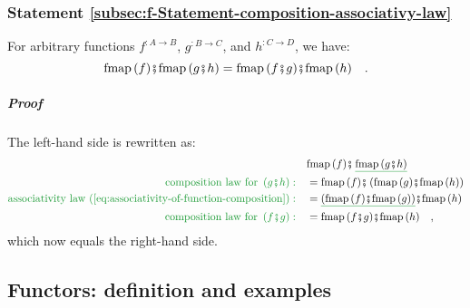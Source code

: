 \subsubsection{Statement \label{subsec:f-Statement-composition-associativy-law}\ref{subsec:f-Statement-composition-associativy-law}}

For arbitrary functions $f^{:A\rightarrow B}$, $g^{:B\rightarrow C}$,
and $h^{:C\rightarrow D}$, we have:
\[
\text{fmap}\,(f)\bef\text{fmap}\,(g\bef h)=\text{fmap}\,(f\bef g)\bef\text{fmap}\,(h)\quad.
\]


\subparagraph{Proof}

The left-hand side is rewritten as:
\begin{align*}
 & \text{fmap}\,(f)\bef\,\gunderline{\text{fmap}\,(g\bef h)}\\
{\color{greenunder}\text{composition law for }\left(g\bef h\right):}\quad & =\text{fmap}\,(f)\bef\left(\text{fmap}\,(g)\bef\text{fmap}\,(h)\right)\\
{\color{greenunder}\text{associativity law (\ref{eq:associativity-of-function-composition})}:}\quad & =\gunderline{\left(\text{fmap}\,(f)\bef\text{fmap}\,(g)\right)}\bef\text{fmap}\,(h)\\
{\color{greenunder}\text{composition law for }\left(f\bef g\right):}\quad & =\text{fmap}\,(f\bef g)\bef\text{fmap}\,(h)\quad,
\end{align*}
which now equals the right-hand side.

\subsection{Functors: definition and examples\label{subsec:Functors:-definition-and-examples}}

